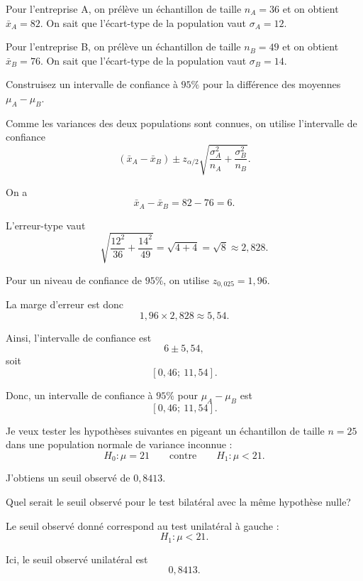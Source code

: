 \begin{questions}
Pour l'entreprise A, on prélève un échantillon de taille \(n_A=36\) et on obtient \(\bar x_A=82\). On sait que l'écart-type de la population vaut \(\sigma_A=12\).

Pour l'entreprise B, on prélève un échantillon de taille \(n_B=49\) et on obtient \(\bar x_B=76\). On sait que l'écart-type de la population vaut \(\sigma_B=14\).

Construisez un intervalle de confiance à \(95\%\) pour la différence des moyennes \(\mu_A-\mu_B\).

\begin{solution}
Comme les variances des deux populations sont connues, on utilise l'intervalle de confiance
\[
(\bar x_A-\bar x_B)\pm z_{\alpha/2}\sqrt{\frac{\sigma_A^2}{n_A}+\frac{\sigma_B^2}{n_B}}.
\]

On a
\[
\bar x_A-\bar x_B=82-76=6.
\]

L'erreur-type vaut
\[
\sqrt{\frac{12^2}{36}+\frac{14^2}{49}}
=\sqrt{4+4}
=\sqrt{8}
\approx 2{,}828.
\]

Pour un niveau de confiance de \(95\%\), on utilise \(z_{0{,}025}=1{,}96\).

La marge d'erreur est donc
\[
1{,}96\times 2{,}828\approx 5{,}54.
\]

Ainsi, l'intervalle de confiance est
\[
6\pm 5{,}54,
\]
soit
\[
[0{,}46;\ 11{,}54].
\]

Donc, un intervalle de confiance à \(95\%\) pour \(\mu_A-\mu_B\) est
\[
\boxed{[0{,}46;\ 11{,}54]}.
\]
\end{solution}

\vspace{2in}




\newpage 

\question[8]
Je veux tester les hypothèses suivantes en pigeant un échantillon de taille \(n=25\) dans une population normale de variance inconnue :
\[
H_0:\mu=21
\qquad \text{contre} \qquad
H_1:\mu<21.
\]

J'obtiens un seuil observé de \(0{,}8413\).

Quel serait le seuil observé pour le test bilatéral avec la même hypothèse nulle?

\begin{solution}
Le seuil observé donné correspond au test unilatéral à gauche :
\[
H_1:\mu<21.
\]

Ici, le seuil observé unilatéral est
\[
0{,}8413.
\]


\end{solution}
\end{questions}
